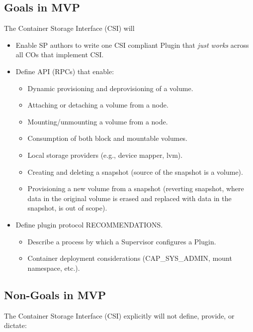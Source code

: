 \documentclass[12pt]{article}
\begin{document}
\subsection{Goals in MVP}

The Container Storage Interface (CSI) will

\begin{itemize}
  \item Enable SP authors to write one CSI compliant Plugin that
    \emph{just works} across all COs that implement CSI.
  \item Define API (RPCs) that enable:
  \begin{itemize}
    \item Dynamic provisioning and deprovisioning of a volume.
    \item Attaching or detaching a volume from a node.
    \item Mounting/unmounting a volume from a node.
    \item Consumption of both block and mountable volumes.
    \item Local storage providers (e.g., device mapper, lvm).
    \item Creating and deleting a snapshot (source of the snapshot is a volume).
    \item Provisioning a new volume from a snapshot (reverting snapshot,
      where data in the original volume is erased and replaced with data
      in the snapshot, is out of scope).
  \end{itemize}
  \item Define plugin protocol RECOMMENDATIONS.
  \begin{itemize}
    \item Describe a process by which a Supervisor configures a Plugin.
    \item Container deployment considerations (CAP\_SYS\_ADMIN, mount namespace, etc.).
  \end{itemize}
\end{itemize}

\subsection{Non-Goals in MVP}

The Container Storage Interface (CSI) explicitly will not define,
provide, or dictate:
\end{document}
